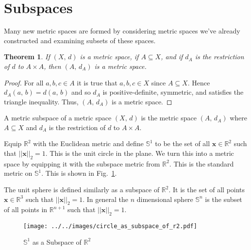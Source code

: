 \documentclass{article}
\theoremstyle{plain}
\newtheorem{theorem}{Theorem}[section]
\theoremstyle{normal}
\newenvironment{example}{%
    \pushQED{\qed}\renewcommand{\qedsymbol}{$\blacksquare$}\examplex%
}{%
    \popQED\endexamplex%
}
\newenvironment{definition}{%
    \pushQED{\qed}\renewcommand{\qedsymbol}{$\blacksquare$}\definitionx%
}{%
    \popQED\enddefinitionx%
}
\begin{document}
    \section{Subspaces}
        Many new metric spaces are formed by considering metric spaces we've
        already constructed and examining subsets of these spaces.
        \begin{theorem}
            If $(X,\,d)$ is a metric space, if $A\subseteq{X}$, and if
            $d_{A}$ is the restriction of $d$ to $A\times{A}$, then
            $(A,\,d_{A})$ is a metric space.
        \end{theorem}
        \begin{proof}
            For all $a,b,c\in{A}$ it is true that $a,b,c\in{X}$ since
            $A\subseteq{X}$. Hence $d_{A}(a,\,b)=d(a,\,b)$ and so
            $d_{A}$ is positive-definite, symmetric, and satisfies the
            triangle inequality. Thus, $(A,\,d_{A})$ is a metric space.
        \end{proof}
        \begin{definition}[\textbf{Metric Subspace}]
            A metric subspace of a metric space $(X,\,d)$ is the metric space
            $(A,\,d_{A})$ where $A\subseteq{X}$ and $d_{A}$ is the restriction
            of $d$ to $A\times{A}$.
        \end{definition}
        \begin{example}
            Equip $\mathbb{R}^{2}$ with the Euclidean metric and define
            $\mathbb{S}^{1}$ to be the set of all $\mathbf{x}\in\mathbb{R}^{2}$
            such that $||\mathbf{x}||_{2}=1$. This is the unit circle in the
            plane. We turn this into a metric space by equipping it with the
            subspace metric from $\mathbb{R}^{2}$. This is the standard metric
            on $\mathbb{S}^{1}$. This is shown in
            Fig.~\ref{fig:circle_as_subspace_of_r2}.
        \end{example}
        \begin{example}
            The unit sphere is defined similarly as a subspace of
            $\mathbb{R}^{2}$. It is the set of all points
            $\mathbf{x}\in\mathbb{R}^{3}$ such that $||\mathbf{x}||_{2}=1$.
            In general the $n$ dimensional sphere $\mathbb{S}^{n}$ is the
            subset of all points in $\mathbb{R}^{n+1}$ such that
            $||\mathbf{x}||_{2}=1$.
        \end{example}
        \begin{figure}
            \centering
            \texttt{[image: ../../images/circle\_as\_subspace\_of\_r2.pdf]}
            \caption{$\mathbb{S}^{1}$ as a Subspace of $\mathbb{R}^{2}$}
            \label{fig:circle_as_subspace_of_r2}
        \end{figure}
\end{document}
